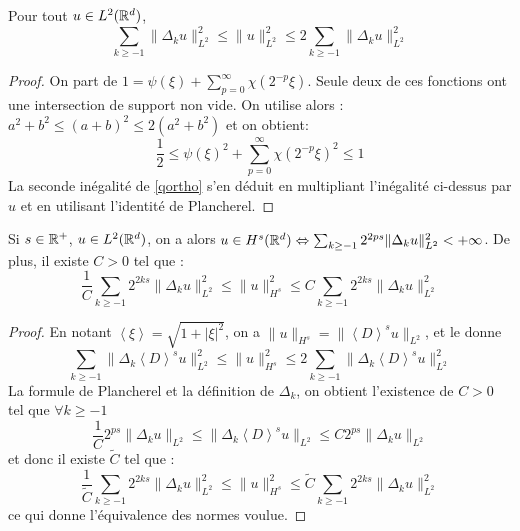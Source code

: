 \documentclass[11pt,a4paper]{article}
\begin{document}
\begin{lemma}\label{lqortho}
Pour tout $u\in L^2(\mathbb R^d)$, 
\begin{equation}\label{qortho}
\sum_{k \geq -1} \|\Delta_k u \|^2_{L^2} \leq \| u \|^2_{L^2} \leq 2 \sum_{k \geq -1} \|\Delta_k u \|^2_{L^2} 
\end{equation}
\end{lemma}

\begin{proof}
On part de $1= \psi(\xi) + \sum_{p=0}^\infty \chi(2^{-p} \xi)$.
Seule deux de ces fonctions ont une intersection de support non vide. On utilise alors : $a^2 +b^2 \leq (a+b)^2 \leq 2(a^2 +b^2)$ et on obtient:
$$ \frac{1}{2} \leq \psi(\xi)^2 + \sum_{p=0}^\infty \chi(2^{-p} \xi)^2 \leq 1$$
La seconde inégalité de \eqref{qortho} s'en déduit en multipliant l'inégalité ci-dessus par $\hat{u}$ et en utilisant l'identité de Plancherel.
\end{proof}

\begin{prop}\label{prop_carac_sobolev}
Si $s\in \mathbb R^+$, $u\in L^2(\mathbb R^d)$, on a alors $u\in H^s(\mathbb R^d) \Leftrightarrow \sum_{k\geq -1}2^{2ps}\|\Delta_k u \|_{L^2}^2 < +\infty$. De plus, il existe $C>0$ tel que :
\begin{equation}\label{carac_sobol}
\frac{1}{C}\sum_{k\geq -1}2^{2ks}\|\Delta_k u \|_{L^2}^2 \leq \|u\|_{H^s}^2 \leq C \sum_{k\geq -1}2^{2ks}\|\Delta_k u \|_{L^2}^2 
\end{equation}
\end{prop}

\begin{proof}
En notant $\left\langle \xi \right\rangle = \sqrt{1 + |\xi|^2}$, on a $\|u\|_{H^s} = \|\left\langle D \right\rangle^su\|_{L^2}$, et le  donne 
\[\sum_{k \geq -1} \|\Delta_k \left\langle D \right\rangle^su \|^2_{L^2} \leq \| u \|^2_{H^s} \leq 2 \sum_{k \geq -1} \|\Delta_k \left\langle D \right\rangle^su \|^2_{L^2} \]
La formule de Plancherel et la définition de $\Delta_k$, on obtient l'existence de $C>0$ tel que $\forall k \geq -1$
\[\frac{1}{C}2^{ps}\|\Delta_ku\|_{L^2} \leq  \|\Delta_k\left\langle D \right\rangle^su\|_{L^2} \leq C2^{ps}\|\Delta_ku\|_{L^2} \]
et donc il existe $\tilde{C}$ tel que :
\[
\frac{1}{\tilde{C}}\sum_{k\geq -1}2^{2ks}\|\Delta_k u \|_{L^2}^2 \leq \|u\|_{H^s}^2 \leq \tilde{C} \sum_{k\geq -1}2^{2ks}\|\Delta_k u \|_{L^2}^2 \]
ce qui donne l'équivalence des normes voulue.
\end{proof}
\end{document}
